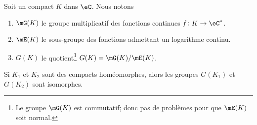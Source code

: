 \begin{definition}        \label{DEFooURFMooXIaRkl}
    Soit un compact \( K\) dans \( \eC\). Nous notons
    \begin{enumerate}
        \item
            \( \mG(K)\) le groupe multiplicatif des fonctions continues \( f\colon K\to \eC^*\).
        \item
            \( \mE(K)\) le sous-groupe des fonctions admettant un logarithme continu.
        \item
            \( G(K)\) le quotient\footnote{Le groupe \( \mG(K)\) est commutatif; donc pas de problèmes pour que \( \mE(K)\) soit normal.} \( G(K)=\mG(K)/\mE(K)\).
    \end{enumerate}
\end{definition}

\begin{lemma}     \label{LEMooHEOWooHTtHsJ}
    Si \( K_1\) et \( K_2\) sont des compacts homéomorphes, alors les groupes \( G(K_1)\) et \( G(K_2)\) sont isomorphes.
\end{lemma}

